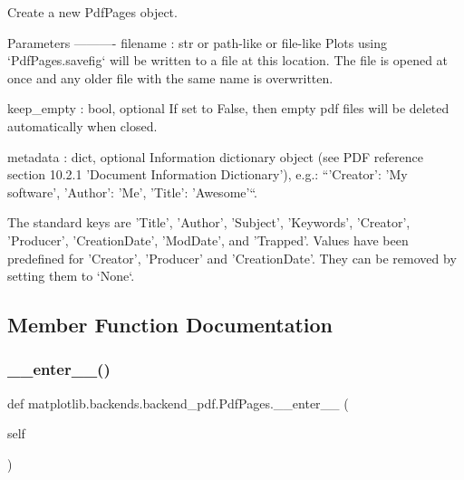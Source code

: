 \begin{DoxyVerb}Create a new PdfPages object.

Parameters
----------
filename : str or path-like or file-like
    Plots using `PdfPages.savefig` will be written to a file at this
    location. The file is opened at once and any older file with the
    same name is overwritten.

keep_empty : bool, optional
    If set to False, then empty pdf files will be deleted automatically
    when closed.

metadata : dict, optional
    Information dictionary object (see PDF reference section 10.2.1
    'Document Information Dictionary'), e.g.:
    ``{'Creator': 'My software', 'Author': 'Me', 'Title': 'Awesome'}``.

    The standard keys are 'Title', 'Author', 'Subject', 'Keywords',
    'Creator', 'Producer', 'CreationDate', 'ModDate', and
    'Trapped'. Values have been predefined for 'Creator', 'Producer'
    and 'CreationDate'. They can be removed by setting them to `None`.
\end{DoxyVerb}
 

\subsection{Member Function Documentation}
\mbox{\label{classmatplotlib_1_1backends_1_1backend__pdf_1_1PdfPages_ad4fefcb92522d11ef1e25751190f196a}} 
\subsubsection{\texorpdfstring{\+\_\+\+\_\+enter\+\_\+\+\_\+()}{\_\_enter\_\_()}}
{\footnotesize\ttfamily def matplotlib.\+backends.\+backend\+\_\+pdf.\+Pdf\+Pages.\+\_\+\+\_\+enter\+\_\+\+\_\+ (\begin{DoxyParamCaption}\item[{}]{self }\end{DoxyParamCaption})}

\mbox{\label{classmatplotlib_1_1backends_1_1backend__pdf_1_1PdfPages_a6f5653c5d7f0ae1cfd7339d085896e1f}} 
